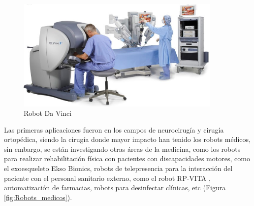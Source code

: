 \begin{figure} [H]
    \begin{center}
      \includegraphics[width=10cm]{figs/Robot Da Vinci.png}
    \end{center}
    \caption{Robot Da Vinci}
    \label{fig:RobotDaVinci}
\end{figure}

Las primeras aplicaciones fueron en los campos de neurocirugía y cirugía ortopédica, siendo la cirugía donde mayor impacto han tenido los robots médicos, %
sin embargo, se están investigando otras áreas de la medicina, como los robots para realizar rehabilitación física con pacientes con discapacidades motores, como el exoesqueleto Ekso Bionics, robots de telepresencia para la interacción del paciente con el personal sanitario externo, como el robot RP-VITA , automatización de farmacias, robots para desinfectar clínicas, etc (Figura \ref{fig:Robots_medicos}). \cite{Dupont21}\\

